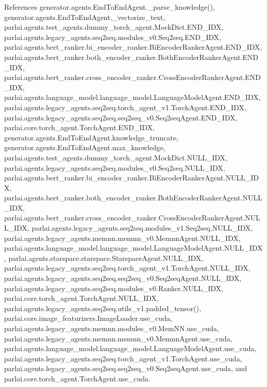 References generator.\+agents.\+End\+To\+End\+Agent.\+\_\+parse\+\_\+knowledge(), generator.\+agents.\+End\+To\+End\+Agent.\+\_\+vectorize\+\_\+text, parlai.\+agents.\+test\+\_\+agents.\+dummy\+\_\+torch\+\_\+agent.\+Mock\+Dict.\+E\+N\+D\+\_\+\+I\+DX, parlai.\+agents.\+legacy\+\_\+agents.\+seq2seq.\+modules\+\_\+v0.\+Seq2seq.\+E\+N\+D\+\_\+\+I\+DX, parlai.\+agents.\+bert\+\_\+ranker.\+bi\+\_\+encoder\+\_\+ranker.\+Bi\+Encoder\+Ranker\+Agent.\+E\+N\+D\+\_\+\+I\+DX, parlai.\+agents.\+bert\+\_\+ranker.\+both\+\_\+encoder\+\_\+ranker.\+Both\+Encoder\+Ranker\+Agent.\+E\+N\+D\+\_\+\+I\+DX, parlai.\+agents.\+bert\+\_\+ranker.\+cross\+\_\+encoder\+\_\+ranker.\+Cross\+Encoder\+Ranker\+Agent.\+E\+N\+D\+\_\+\+I\+DX, parlai.\+agents.\+language\+\_\+model.\+language\+\_\+model.\+Language\+Model\+Agent.\+E\+N\+D\+\_\+\+I\+DX, parlai.\+agents.\+legacy\+\_\+agents.\+seq2seq.\+torch\+\_\+agent\+\_\+v1.\+Torch\+Agent.\+E\+N\+D\+\_\+\+I\+DX, parlai.\+agents.\+legacy\+\_\+agents.\+seq2seq.\+seq2seq\+\_\+v0.\+Seq2seq\+Agent.\+E\+N\+D\+\_\+\+I\+DX, parlai.\+core.\+torch\+\_\+agent.\+Torch\+Agent.\+E\+N\+D\+\_\+\+I\+DX, generator.\+agents.\+End\+To\+End\+Agent.\+knowledge\+\_\+truncate, generator.\+agents.\+End\+To\+End\+Agent.\+max\+\_\+knowledge, parlai.\+agents.\+test\+\_\+agents.\+dummy\+\_\+torch\+\_\+agent.\+Mock\+Dict.\+N\+U\+L\+L\+\_\+\+I\+DX, parlai.\+agents.\+legacy\+\_\+agents.\+seq2seq.\+modules\+\_\+v0.\+Seq2seq.\+N\+U\+L\+L\+\_\+\+I\+DX, parlai.\+agents.\+bert\+\_\+ranker.\+bi\+\_\+encoder\+\_\+ranker.\+Bi\+Encoder\+Ranker\+Agent.\+N\+U\+L\+L\+\_\+\+I\+DX, parlai.\+agents.\+bert\+\_\+ranker.\+both\+\_\+encoder\+\_\+ranker.\+Both\+Encoder\+Ranker\+Agent.\+N\+U\+L\+L\+\_\+\+I\+DX, parlai.\+agents.\+bert\+\_\+ranker.\+cross\+\_\+encoder\+\_\+ranker.\+Cross\+Encoder\+Ranker\+Agent.\+N\+U\+L\+L\+\_\+\+I\+DX, parlai.\+agents.\+legacy\+\_\+agents.\+seq2seq.\+modules\+\_\+v1.\+Seq2seq.\+N\+U\+L\+L\+\_\+\+I\+DX, parlai.\+agents.\+legacy\+\_\+agents.\+memnn.\+memnn\+\_\+v0.\+Memnn\+Agent.\+N\+U\+L\+L\+\_\+\+I\+DX, parlai.\+agents.\+language\+\_\+model.\+language\+\_\+model.\+Language\+Model\+Agent.\+N\+U\+L\+L\+\_\+\+I\+DX, parlai.\+agents.\+starspace.\+starspace.\+Starspace\+Agent.\+N\+U\+L\+L\+\_\+\+I\+DX, parlai.\+agents.\+legacy\+\_\+agents.\+seq2seq.\+torch\+\_\+agent\+\_\+v1.\+Torch\+Agent.\+N\+U\+L\+L\+\_\+\+I\+DX, parlai.\+agents.\+legacy\+\_\+agents.\+seq2seq.\+seq2seq\+\_\+v0.\+Seq2seq\+Agent.\+N\+U\+L\+L\+\_\+\+I\+DX, parlai.\+agents.\+legacy\+\_\+agents.\+seq2seq.\+modules\+\_\+v0.\+Ranker.\+N\+U\+L\+L\+\_\+\+I\+DX, parlai.\+core.\+torch\+\_\+agent.\+Torch\+Agent.\+N\+U\+L\+L\+\_\+\+I\+DX, parlai.\+agents.\+legacy\+\_\+agents.\+seq2seq.\+utils\+\_\+v1.\+padded\+\_\+tensor(), parlai.\+core.\+image\+\_\+featurizers.\+Image\+Loader.\+use\+\_\+cuda, parlai.\+agents.\+legacy\+\_\+agents.\+memnn.\+modules\+\_\+v0.\+Mem\+N\+N.\+use\+\_\+cuda, parlai.\+agents.\+legacy\+\_\+agents.\+memnn.\+memnn\+\_\+v0.\+Memnn\+Agent.\+use\+\_\+cuda, parlai.\+agents.\+language\+\_\+model.\+language\+\_\+model.\+Language\+Model\+Agent.\+use\+\_\+cuda, parlai.\+agents.\+legacy\+\_\+agents.\+seq2seq.\+torch\+\_\+agent\+\_\+v1.\+Torch\+Agent.\+use\+\_\+cuda, parlai.\+agents.\+legacy\+\_\+agents.\+seq2seq.\+seq2seq\+\_\+v0.\+Seq2seq\+Agent.\+use\+\_\+cuda, and parlai.\+core.\+torch\+\_\+agent.\+Torch\+Agent.\+use\+\_\+cuda.

